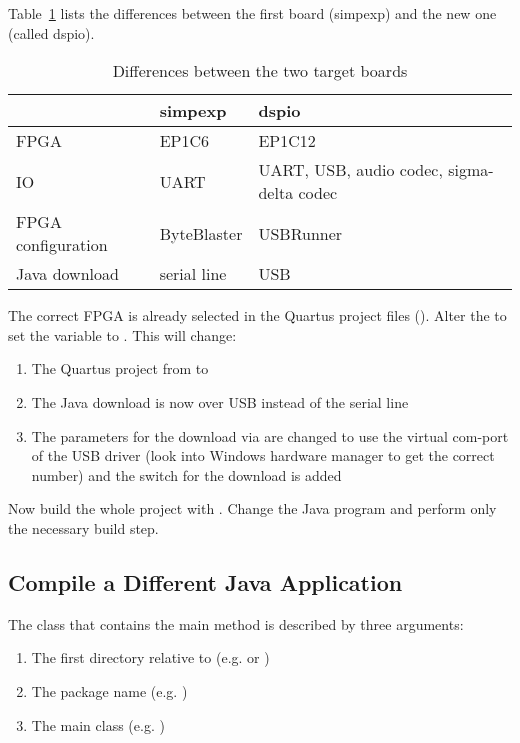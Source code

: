 Table~\ref{tab:boards} lists the  differences between the first
board (simpexp) and the new one (called dspio).
%
\begin{table}
    \centering

\begin{tabular}{lll}
    \toprule
       & simpexp & dspio \\
    \midrule
    FPGA & EP1C6 & EP1C12 \\
    IO & UART & UART, USB, audio codec, sigma-delta codec \\
    FPGA configuration & ByteBlaster & USBRunner \\
    Java download & serial line & USB \\

    \bottomrule

\end{tabular}
    \caption{Differences between the two target boards}
    \label{tab:boards}

\end{table}
%
The correct FPGA is already selected in the Quartus project files
(). Alter the  to set the variable
 to . This will change:

\begin{enumerate}
    \item The Quartus project from  to 
    \item The Java download is now over USB instead of the serial
        line
    \item The parameters for the download via  are
        changed to use the virtual com-port of the USB driver
        (look into Windows hardware manager to get the correct
        number) and the switch  for the download is
        added
\end{enumerate}

Now build the whole project with . Change the Java
program and perform only the necessary build step.

\subsection{Compile a Different Java Application}

The class that contains the main method is described by three
arguments:
\begin{enumerate}
    \item The first directory relative to 
    (e.g.  or )
    \item The package name (e.g. )
    \item The main class (e.g. )
\end{enumerate}

